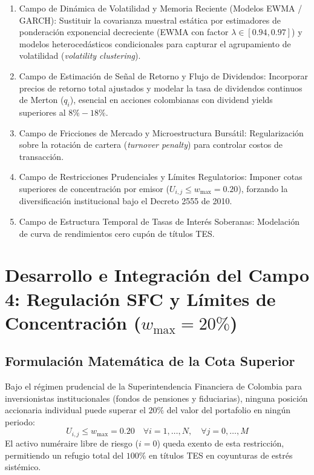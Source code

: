 \documentclass[11pt,a4paper]{article}
\begin{document}
\begin{enumerate}
    \item Campo de Dinámica de Volatilidad y Memoria Reciente (Modelos EWMA / GARCH):
    Sustituir la covarianza muestral estática por estimadores de ponderación exponencial decreciente (EWMA con factor $\lambda \in [0.94, 0.97]$) y modelos heterocedásticos condicionales para capturar el agrupamiento de volatilidad (\emph{volatility clustering}).
    \item Campo de Estimación de Señal de Retorno y Flujo de Dividendos:
    Incorporar precios de retorno total ajustados y modelar la tasa de dividendos continuos de Merton ($q_i$), esencial en acciones colombianas con dividend yields superiores al $8\%-18\%$.
    \item Campo de Fricciones de Mercado y Microestructura Bursátil:
    Regularización sobre la rotación de cartera (\emph{turnover penalty}) para controlar costos de transacción.
    \item Campo de Restricciones Prudenciales y Límites Regulatorios:
    Imponer cotas superiores de concentración por emisor ($U_{i,j} \le w_{\max} = 0.20$), forzando la diversificación institucional bajo el Decreto 2555 de 2010.
    \item Campo de Estructura Temporal de Tasas de Interés Soberanas:
    Modelación de curva de rendimientos cero cupón de títulos TES.
\end{enumerate}

\section{Desarrollo e Integración del Campo 4: Regulación SFC y Límites de Concentración \texorpdfstring{($w_{\max} = 20\%$)}{(w\_max = 20\%)}}

\subsection{Formulación Matemática de la Cota Superior}
Bajo el régimen prudencial de la Superintendencia Financiera de Colombia para inversionistas institucionales (fondos de pensiones y fiduciarias), ninguna posición accionaria individual puede superar el $20\%$ del valor del portafolio en ningún periodo:
\begin{equation}
    U_{i,j} \le w_{\max} = 0.20 \quad \forall i = 1, \dots, N, \quad \forall j = 0, \dots, M
\end{equation}
El activo numéraire libre de riesgo ($i=0$) queda exento de esta restricción, permitiendo un refugio total del $100\%$ en títulos TES en coyunturas de estrés sistémico.
\end{document}
